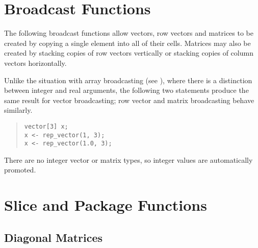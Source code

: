 \section{Broadcast Functions}

The following broadcast functions allow vectors, row vectors and
matrices to be created by copying a single element into all of their
cells.  Matrices may also be created by stacking copies of row vectors
vertically or stacking copies of column vectors horizontally.

\begin{description}
%
%
%
%
%
%
\end{description}
%

Unlike the situation with array broadcasting (see ), where there is a
distinction between integer and real arguments, the following two
statements produce the same result for vector broadcasting;  row vector
and matrix broadcasting behave similarly.
%
\begin{quote}
\begin{Verbatim}[fontsize=\small]
vector[3] x;
x <- rep_vector(1, 3);
x <- rep_vector(1.0, 3);  
\end{Verbatim}
\end{quote}
%
There are no integer vector or matrix types, so integer values are
automatically promoted.

\section{Slice and Package Functions}

\subsection{Diagonal Matrices}

